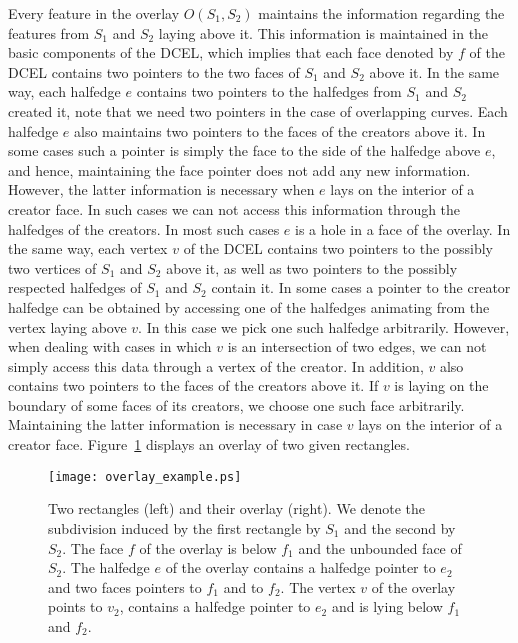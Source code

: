 Every feature in the overlay $O(S_1, S_2)$ maintains the 
information regarding the features from $S_1$ and $S_2$ laying above it.
This information is maintained in the basic components of the DCEL, 
which implies that each face denoted by $f$ of the DCEL contains two pointers 
to the two faces of $S_1$ and $S_2$  above it. 
In the same way, each halfedge $e$ contains two pointers to the halfedges 
from $S_1$ and $S_2$ created it, note that we need two pointers in the 
case of overlapping curves. 
Each halfedge $e$ also maintains two pointers to the faces of the creators above it. 
In some cases such a pointer is simply the face to the side of the halfedge 
above $e$, and hence, maintaining the face pointer does not add any new information. 
However, the latter information is necessary when $e$ lays on the interior of a creator face. 
In such cases we can not access this information through the halfedges of the creators. 
In most such cases $e$ is a hole in a face of the overlay.
In the same way, each vertex $v$ of the DCEL contains two pointers to the 
possibly two vertices of $S_1$ and $S_2$ above it, 
as well as two pointers to the possibly respected halfedges of $S_1$ and $S_2$ 
contain it. In some cases a pointer to the creator halfedge can be obtained by 
accessing one of the halfedges animating from the vertex laying above $v$.
In this case we pick one such halfedge arbitrarily.
However, when dealing with cases in which $v$ is an intersection of two edges, 
we can not simply access this data through a vertex of the creator.
In addition, $v$ also contains two pointers to the 
faces of the creators above it. 
If $v$ is laying on the boundary of some faces of its creators, 
we choose one such face arbitrarily.
Maintaining the latter information is necessary 
in case $v$ lays on the interior of a creator face.
Figure~\ref{OVL_sec:overlay_example} displays an overlay of two given rectangles.

\begin{figure}[h]
    \begin{ccTexOnly}
        \centerline{
           \texttt{[image: overlay\_example.ps]}
           }
    \end{ccTexOnly}
    \caption{Two rectangles (left) and their overlay (right). We denote the subdivision 
       induced by the first rectangle by $S_1$ and the second by $S_2$. 
       The face $f$ of the overlay is below $f_1$ and the unbounded face of $S_2$. 
       The halfedge $e$ of the overlay contains a halfedge pointer to $e_2$ 
       and two faces pointers to $f_1$ and to $f_2$. 
       The vertex $v$ of the overlay points to $v_2$, contains a halfedge 
       pointer to $e_2$ and is lying below $f_1$ and $f_2$.}
    \label{OVL_sec:overlay_example}
\end{figure}


